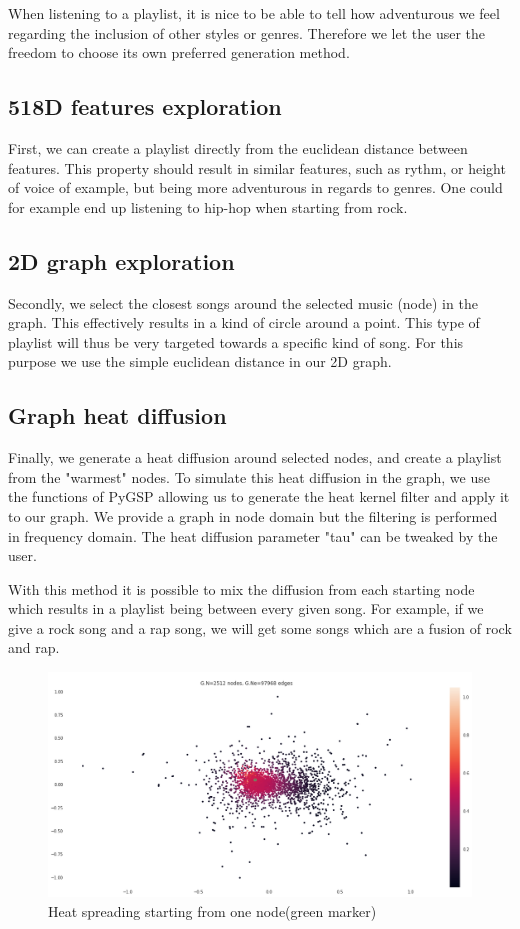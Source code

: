 \documentclass[11pt,a4paper,twoside]{article}
\begin{document}
When listening to a playlist, it is nice to be able to tell how adventurous we feel regarding the inclusion of other styles or genres. Therefore we let the user the freedom to choose its own preferred generation method. 

\subsection{518D features exploration}
First, we can create a playlist directly from the euclidean distance between features. This property should result in similar features, such as rythm, or height of voice of example, but being more adventurous in regards to genres. One could for example end up listening to hip-hop when starting from rock.

\subsection{2D graph exploration}
Secondly, we select the closest songs around the selected music (node) in the graph. This effectively results in a kind of circle around a point. This type of playlist will thus be very targeted towards a specific kind of song. For this purpose we use the simple euclidean distance in our 2D graph.

\subsection{Graph heat diffusion}
Finally, we generate a heat diffusion around selected nodes, and create a playlist from the "warmest" nodes. To simulate this heat diffusion in the graph, we use the functions of PyGSP allowing us to generate the heat kernel filter and apply it to our graph. We provide a graph in node domain but the filtering is performed in frequency domain. The heat diffusion parameter "tau" can be tweaked by the user.

With this method it is possible to mix the diffusion from each starting node which results in a playlist being between every given song. For example, if we give a rock song and a rap song, we will get some songs which are a fusion of rock and rap.

\newpage

\begin{figure}[H]
  \centering
    \includegraphics[width=\textwidth]{./Figures/heat}
  \caption{Heat spreading starting from one node(green marker)}
  \label{fig:}
\end{figure}
\end{document}
